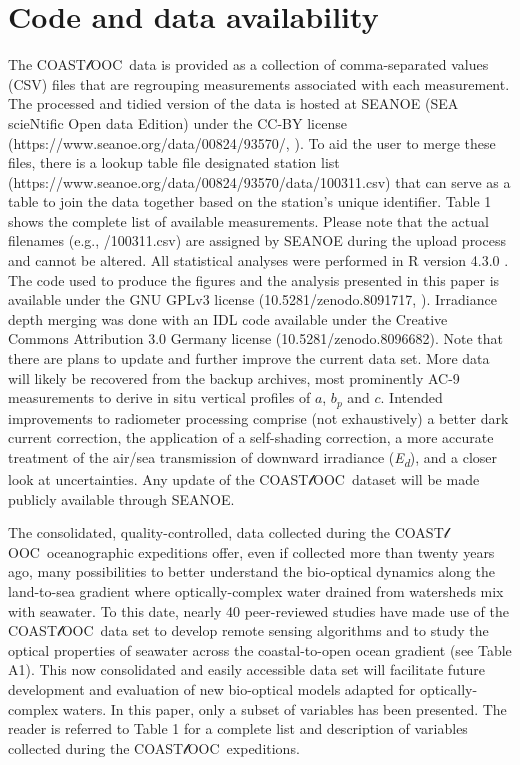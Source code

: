 \documentclass[essd, manuscript]{copernicus}
\newcommand{\coastlooc}{COAST$\mathscr{l}$OOC~\allowbreak}
\begin{document}
\section{Code and data availability}

The \coastlooc data is provided as a collection of comma-separated values (CSV) files that are regrouping measurements associated with each measurement. The processed and tidied version of the data is hosted at SEANOE (SEA scieNtific Open data Edition) under the CC-BY license (https://www.seanoe.org/data/00824/93570/, \citealt{massicotte2023}). To aid the user to merge these files, there is a lookup table file designated station list (https://www.seanoe.org/data/00824/93570/data/100311.csv) that can serve as a table to join the data together based on the station’s unique identifier. Table 1 shows the complete list of available measurements. Please note that the actual filenames (e.g., /100311.csv) are assigned by SEANOE during the upload process and cannot be altered.   All statistical analyses were performed in R version 4.3.0 \citep{RCoreTeam2022}. The code used to produce the figures and the analysis presented in this paper is available under the GNU GPLv3 license (10.5281/zenodo.8091717, \citealt{Massicotte2023}). Irradiance depth merging was done with an IDL code available under the Creative Commons Attribution 3.0 Germany license (10.5281/zenodo.8096682). Note that there are plans to update and further improve the current data set. More data will likely be recovered from the backup archives, most prominently AC-9 measurements to derive in situ vertical profiles of $a$, $b_p$ and $c$. Intended improvements to radiometer processing comprise (not exhaustively) a better dark current correction, the application of a self-shading correction, a more accurate treatment of the air/sea transmission of downward irradiance (\textit{E\textsubscript{d}}), and a closer look at uncertainties. Any update of the \coastlooc dataset will be made publicly available through SEANOE.

\conclusions  %

The consolidated, quality-controlled, data collected during the \coastlooc oceanographic expeditions offer, even if collected more than twenty years ago, many possibilities to better understand the bio-optical dynamics along the land-to-sea gradient where optically-complex water drained from watersheds mix with seawater. To this date, nearly 40 peer-reviewed studies have made use of the \coastlooc data set to develop remote sensing algorithms and to study the optical properties of seawater across the coastal-to-open ocean gradient (see Table A1). This now consolidated and easily accessible data set will facilitate future development and evaluation of new bio-optical models adapted for optically-complex waters. In this paper, only a subset of variables has been presented. The reader is referred to Table 1 for a complete list and description of variables collected during the \coastlooc expeditions.
\end{document}
